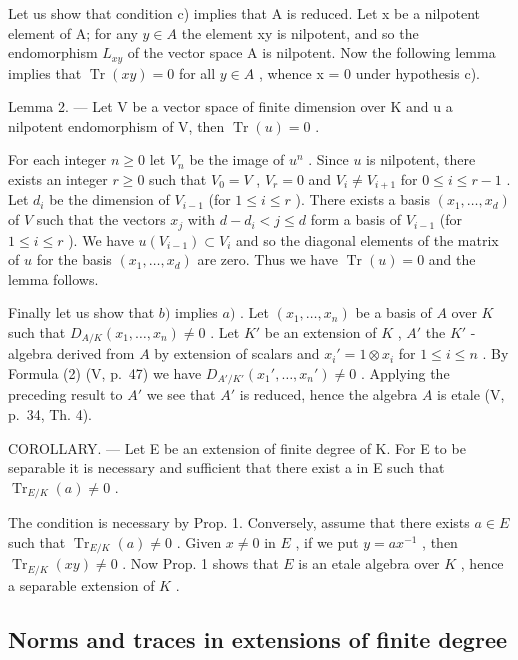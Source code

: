 Let us show that condition c) implies that A is reduced. Let x be a nilpotent element of A; for any \(y \in A\) the element xy is nilpotent, and so the endomorphism \(L_{xy}\) of the vector space A is nilpotent. Now the following lemma implies that \(\operatorname{Tr}(xy) = 0\) for all \(y \in A\) , whence x = 0 under hypothesis c).

Lemma 2. --- Let V be a vector space of finite dimension over K and u a nilpotent endomorphism of V, then \(\operatorname{Tr}(u)=0\) .

For each integer \(n \geqslant 0\) let \(V_n\) be the image of \(u^n\) . Since \(u\) is nilpotent, there exists an integer \(r \geqslant 0\) such that \(V_0 = V\) , \(V_r = 0\) and \(V_i \neq V_{i+1}\) for \(0 \leqslant i \leqslant r-1\) . Let \(d_i\) be the dimension of \(V_{i-1}\) (for \(1 \leqslant i \leqslant r\) ). There exists a basis \((x_1, \ldots, x_d)\) of \(V\) such that the vectors \(x_j\) with \(d - d_i < j \leqslant d\) form a basis of \(V_{i-1}\) (for \(1 \leqslant i \leqslant r\) ). We have \(u(V_{i-1}) \subset V_i\) and so the diagonal elements of the matrix of \(u\) for the basis \((x_1, \ldots, x_d)\) are zero. Thus we have \(\operatorname{Tr}(u) = 0\) and the lemma follows.

Finally let us show that \(b)\) implies \(a)\) . Let \((x_1, \ldots, x_n)\) be a basis of \(A\) over \(K\) such that \(D_{A/K}(x_1, \ldots, x_n) \neq 0\) . Let \(K'\) be an extension of \(K\) , \(A'\) the \(K'\) -algebra derived from \(A\) by extension of scalars and \(x_i' = 1 \otimes x_i\) for \(1 \leqslant i \leqslant n\) . By Formula (2) (V, p.~47) we have \(D_{A'/K'}(x_1', \ldots, x_n') \neq 0\) . Applying the preceding result to \(A'\) we see that \(A'\) is reduced, hence the algebra \(A\) is etale (V, p.~34, Th. 4).

COROLLARY. --- Let E be an extension of finite degree of K. For E to be separable it is necessary and sufficient that there exist a in E such that \(\operatorname{Tr}_{E/K}(a) \neq 0\) .

The condition is necessary by Prop. 1. Conversely, assume that there exists \(a \in E\) such that \(\operatorname{Tr}_{E/K}(a) \neq 0\) . Given \(x \neq 0\) in \(E\) , if we put \(y = ax^{-1}\) , then \(\operatorname{Tr}_{E/K}(xy) \neq 0\) . Now Prop. 1 shows that \(E\) is an etale algebra over \(K\) , hence a separable extension of \(K\) .

\subsection{Norms and traces in extensions of finite degree}

